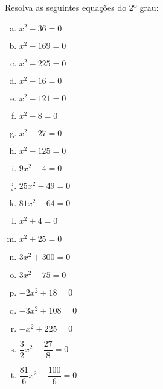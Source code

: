 \begin{exer}
Resolva as seguintes equações do 2º grau:

\begin{multicols}{3}
\begin{enumerate}[a)]
\item $x^2 - 36=0$
\item $x^2 - 169=0$
\item $x^2 - 225=0$
\item $x^2 - 16=0$
\item $x^2 - 121=0$
\item $x^2 - 8=0$
\item $x^2 - 27=0$
\item $x^2 - 125=0$
\item $9x^2 - 4=0$
\item $25x^2 - 49=0$
\item $81x^2 - 64=0$
\item $x^2 + 4=0$
\item $x^2 + 25=0$
\item $3x^2 + 300=0$
\item $3x^2 - 75=0$
\item $-2x^2 + 18=0$
\item $-3x^2 + 108=0$
\item $-x^2 + 225=0$
\item $\dfrac{3}{2}x^2 - \dfrac{27}{8}= 0$
\item $\dfrac{81}{6}x^2 - \dfrac{100}{6}= 0$
\end{enumerate}
\end{multicols}
\end{exer}
